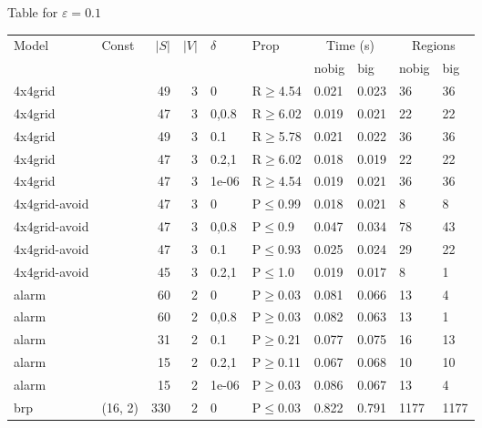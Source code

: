 \small Table for \(\varepsilon=0.1\)
\begin{longtable}{llrrllllll}

        \toprule
        Model & Const & $|S|$ & $|V|$ & $\delta$ & Prop & \multicolumn{2}{c}{Time (s)} & \multicolumn{2}{c}{Regions} \\
        \cmidrule(ll){7-8} \cmidrule(ll){9-10}
        & & & & & & nobig & big & nobig & big \\
        \midrule
        
 4x4grid       &           &     	49 &   3 & 0     & R$\geq$4.54  & 0.021   & 0.023   & 36      & 36   \\
 4x4grid       &           &     	47 &   3 & 0,0.8 & R$\geq$6.02  & 0.019   & 0.021   & 22      & 22   \\
 4x4grid       &           &     	49 &   3 & 0.1   & R$\geq$5.78  & 0.021   & 0.022   & 36      & 36   \\
 4x4grid       &           &     	47 &   3 & 0.2,1 & R$\geq$6.02  & 0.018   & 0.019   & 22      & 22   \\
 4x4grid       &           &     	47 &   3 & 1e-06 & R$\geq$4.54  & 0.019   & 0.021   & 36      & 36   \\
 4x4grid-avoid &           &     	47 &   3 & 0     & P$\leq$0.99  & 0.018   & 0.021   & 8       & 8    \\
 4x4grid-avoid &           &     	47 &   3 & 0,0.8 & P$\leq$0.9   & 0.047   & 0.034   & 78      & 43   \\
 4x4grid-avoid &           &     	47 &   3 & 0.1   & P$\leq$0.93  & 0.025   & 0.024   & 29      & 22   \\
 4x4grid-avoid &           &     	45 &   3 & 0.2,1 & P$\leq$1.0   & 0.019   & 0.017   & 8       & 1    \\
 alarm         &           &     	60 &   2 & 0     & P$\geq$0.03  & 0.081   & 0.066   & 13      & 4    \\
 alarm         &           &     	60 &   2 & 0,0.8 & P$\geq$0.03  & 0.082   & 0.063   & 13      & 1    \\
 alarm         &           &     	31 &   2 & 0.1   & P$\geq$0.21  & 0.077   & 0.075   & 16      & 13   \\
 alarm         &           &     	15 &   2 & 0.2,1 & P$\geq$0.11  & 0.067   & 0.068   & 10      & 10   \\
 alarm         &           &     	15 &   2 & 1e-06 & P$\geq$0.03  & 0.086   & 0.067   & 13      & 4    \\
 brp           & (16, 2)   &    	330 &   2 & 0     & P$\leq$0.03  & 0.822   & 0.791   & 1177    & 1177 \\

\end{longtable}
